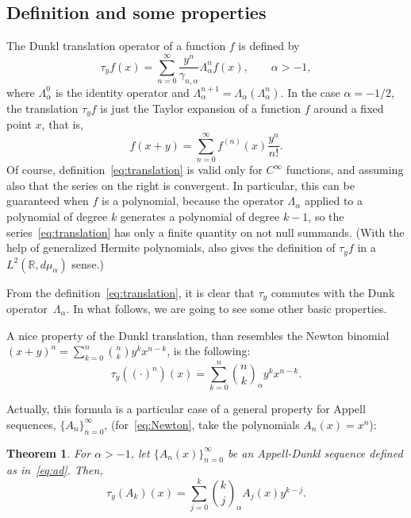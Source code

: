 \documentclass[10pt]{article}
\theoremstyle{plain}
\newtheorem{theorem}{Theorem}[section]
\theoremstyle{definition}
\numberwithin{equation}{section} %
\newcommand{\La}{\Lambda_{\alpha}}
\newcommand{\mua}{\mu_{\alpha}}
\newcommand{\binoma}[2]{\binom{#1}{#2}_{\!\alpha}}
\newcommand{\RR}{\mathbb{R}}
\newcommand{\cc}{\gamma}
\begin{document}
\subsection{Definition and some properties}


The Dunkl translation operator of a function $f$ is defined by
\begin{equation}
\label{eq:translation}
  \tau_y f(x) = \sum_{n=0}^\infty \frac{y^n}{\cc_{n,\alpha}}\La^{n}f(x),
  \qquad \alpha>-1,
\end{equation}
where $\La^0$ is the identity operator and $\La^{n+1} = \La(\La^n)$. 
In the case $\alpha=-1/2$, the translation $\tau_y f$ is just the Taylor expansion of a function $f$ around a fixed point $x$, that is,
\[
  f(x+y) = \sum_{n=0}^\infty f^{(n)}(x) \frac{y^n}{n!}.
\]
Of course, definition~\eqref{eq:translation} is valid only for $C^{\infty}$ functions, and assuming also that the series on the right is convergent. In particular, this can be guaranteed when $f$ is a polynomial, because the operator $\La$ applied to a polynomial of degree $k$ generates a polynomial of degree $k-1$, so the series~\eqref{eq:translation} has only a finite quantity on not null summands. (With the help of generalized Hermite polynomials, \cite{Ros} also gives the definition of $\tau_y f$ in a $L^2(\RR,d\mua)$ sense.)

From the definition~\eqref{eq:translation}, it is clear that $\tau_y$ commutes with the Dunk operator~$\La$.
In what follows, we are going to see some other basic properties.

A nice property of the Dunkl translation, than resembles the Newton binomial $(x+y)^n = \sum_{k=0}^n \binom{n}{k} y^k x^{n-k}$, is the following:
\begin{equation}
\label{eq:Newton}
  \tau_y ((\cdot)^n)(x) = 
  \sum_{k=0}^n \binoma{n}{k} y^k x^{n-k}.
\end{equation}

Actually, this formula is a particular case of a general property for  Appell sequences, $\{A_n\}_{n=0}^{\infty}$, (for~\eqref{eq:Newton}, take the polynomials $A_n(x)=x^n$):

\begin{theorem}
\label{teo:tau-A}
For $\alpha>-1$, let $\{A_n(x)\}_{n= 0}^{\infty}$ be an Appell-Dunkl sequence defined as in~\eqref{eq:ad}. Then,
\begin{equation*}
  \tau_y(A_k)(x)
  = \sum_{j=0}^k \binoma{k}{j} A_j(x) y^{k-j}.
\end{equation*}
\end{theorem}
\end{document}
